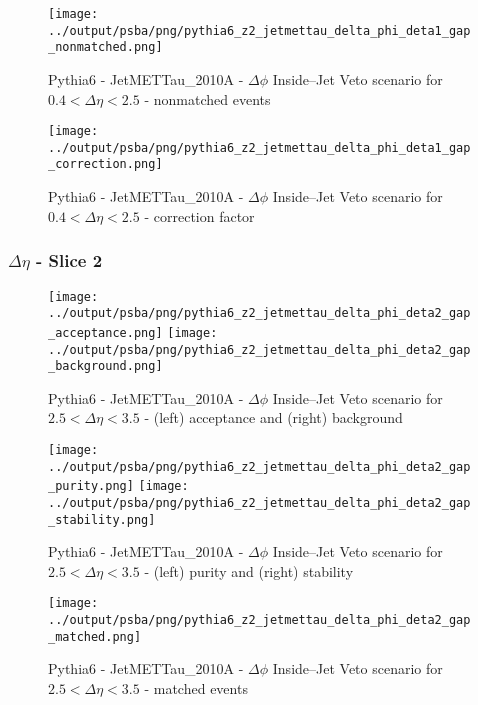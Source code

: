 \documentclass[11pt]{book}
\begin{document}
\begin{figure}[ht]
\centering
\texttt{[image: ../output/psba/png/pythia6\_z2\_jetmettau\_delta\_phi\_deta1\_gap\_nonmatched.png]}
\caption{Pythia6 - JetMETTau\_2010A - $\Delta\phi$ Inside--Jet Veto scenario for $0.4 < \Delta\eta < 2.5$ - nonmatched events}
\label{fig:p6_jetmettau_delta_phi_deta1_gap_nonmatched}
\end{figure}

\begin{figure}[ht]
\centering
\texttt{[image: ../output/psba/png/pythia6\_z2\_jetmettau\_delta\_phi\_deta1\_gap\_correction.png]}
\caption{Pythia6 - JetMETTau\_2010A - $\Delta\phi$ Inside--Jet Veto scenario for $0.4 < \Delta\eta < 2.5$ - correction factor}
\label{fig:p6_jetmettau_delta_phi_deta1_gap_correction}
\end{figure}

\clearpage
\subsubsection{$\Delta\eta$ - Slice 2}
\begin{figure}[ht]
\centering
\texttt{[image: ../output/psba/png/pythia6\_z2\_jetmettau\_delta\_phi\_deta2\_gap\_acceptance.png]}
\texttt{[image: ../output/psba/png/pythia6\_z2\_jetmettau\_delta\_phi\_deta2\_gap\_background.png]}
\caption{Pythia6 - JetMETTau\_2010A - $\Delta\phi$ Inside--Jet Veto scenario for $2.5 < \Delta\eta < 3.5$ - (left) acceptance and (right) background}
\label{fig:p6_jetmettau_delta_phi_deta2_gap_ab}
\end{figure}

\begin{figure}[ht]
\centering
\texttt{[image: ../output/psba/png/pythia6\_z2\_jetmettau\_delta\_phi\_deta2\_gap\_purity.png]}
\texttt{[image: ../output/psba/png/pythia6\_z2\_jetmettau\_delta\_phi\_deta2\_gap\_stability.png]}
\caption{Pythia6 - JetMETTau\_2010A - $\Delta\phi$ Inside--Jet Veto scenario for $2.5 < \Delta\eta < 3.5$ - (left) purity and (right) stability}
\label{fig:p6_jetmettau_delta_phi_deta2_gap_ps}
\end{figure}

\begin{figure}[ht]
\centering
\texttt{[image: ../output/psba/png/pythia6\_z2\_jetmettau\_delta\_phi\_deta2\_gap\_matched.png]}
\caption{Pythia6 - JetMETTau\_2010A - $\Delta\phi$ Inside--Jet Veto scenario for $2.5 < \Delta\eta < 3.5$ - matched events}
\label{fig:p6_jetmettau_delta_phi_deta2_gap_matched}
\end{figure}
\end{document}
